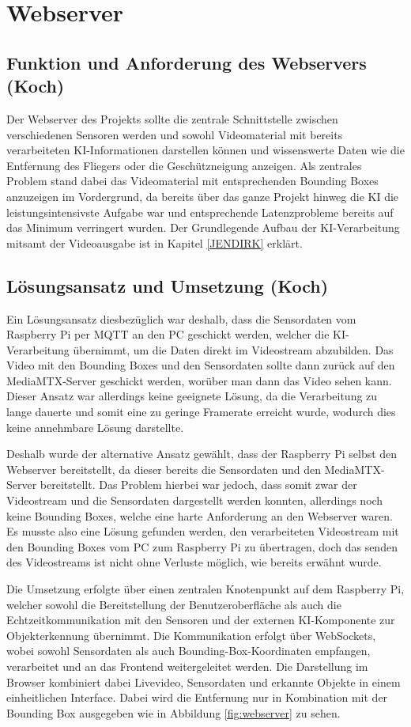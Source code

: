 \chapter{Webserver}
\label{sec:Webserver}
\section{Funktion und Anforderung des Webservers (Koch)}
Der Webserver des Projekts sollte die zentrale Schnittstelle zwischen verschiedenen Sensoren werden und sowohl Videomaterial mit bereits verarbeiteten KI-Informationen darstellen können und wissenswerte Daten wie die Entfernung des Fliegers oder die Geschützneigung anzeigen.
Als zentrales Problem stand dabei das Videomaterial mit entsprechenden Bounding Boxes anzuzeigen im Vordergrund, da bereits über das ganze Projekt hinweg die KI die leistungsintensivste Aufgabe war und entsprechende Latenzprobleme bereits auf das Minimum verringert wurden.
Der Grundlegende Aufbau der KI-Verarbeitung mitsamt der Videoausgabe ist in Kapitel \ref{JENDIRK} erklärt.

\section{Lösungsansatz und Umsetzung (Koch)}
Ein Lösungsansatz diesbezüglich war deshalb, dass die Sensordaten vom Raspberry Pi per MQTT an den PC geschickt werden, welcher die KI-Verarbeitung übernimmt, um die Daten direkt im Videostream abzubilden.
Das Video mit den Bounding Boxes und den Sensordaten sollte dann zurück auf den MediaMTX-Server geschickt werden, worüber man dann das Video sehen kann.
Dieser Ansatz war allerdings keine geeignete Lösung, da die Verarbeitung zu lange dauerte und somit eine zu geringe Framerate erreicht wurde, wodurch dies keine annehmbare Lösung darstellte.


Deshalb wurde der alternative Ansatz gewählt, dass der Raspberry Pi selbst den Webserver bereitstellt, da dieser bereits die Sensordaten und den MediaMTX-Server bereitstellt.
Das Problem hierbei war jedoch, dass somit zwar der Videostream und die Sensordaten dargestellt werden konnten, allerdings noch keine Bounding Boxes, welche eine harte Anforderung an den Webserver waren.
Es musste also eine Lösung gefunden werden, den verarbeiteten Videostream mit den Bounding Boxes vom PC zum Raspberry Pi zu übertragen, doch das senden des Videostreams ist nicht ohne Verluste möglich, wie bereits erwähnt wurde.

Die Umsetzung erfolgte über einen zentralen Knotenpunkt auf dem Raspberry Pi, welcher sowohl die Bereitstellung der Benutzeroberfläche als auch die Echtzeitkommunikation mit den Sensoren und der externen KI-Komponente zur Objekterkennung übernimmt. Die Kommunikation erfolgt über WebSockets, wobei sowohl Sensordaten als auch Bounding-Box-Koordinaten empfangen, verarbeitet und an das Frontend weitergeleitet werden. Die Darstellung im Browser kombiniert dabei Livevideo, Sensordaten und erkannte Objekte in einem einheitlichen Interface. 
Dabei wird die Entfernung nur in Kombination mit der Bounding Box ausgegeben wie in Abbildung \ref{fig:webserver} zu sehen.

